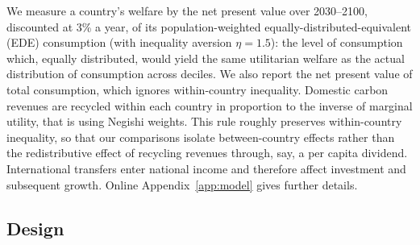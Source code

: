\documentclass[12pt,english]{article}
\theoremstyle{remark}
\begin{document}
We measure a country's welfare by the net present value over 2030--2100, discounted at 3\% a year, of its population-weighted equally-distributed-equivalent (EDE) consumption (with inequality aversion $\eta=1.5$): the level of consumption which, equally distributed, would yield the same utilitarian welfare as the actual distribution of consumption across deciles. We also report the net present value of total consumption, which ignores within-country inequality.  %
Domestic carbon revenues are recycled within each country in proportion to %
the inverse of marginal utility, that is using Negishi weights. %
This rule roughly preserves within-country inequality, so that our comparisons isolate between-country effects rather than the redistributive effect of recycling revenues through, say, a per capita dividend. %
International transfers enter national income and therefore affect investment and subsequent growth. Online Appendix~\ref{app:model} gives further details.

\subsection{Design}
\end{document}

